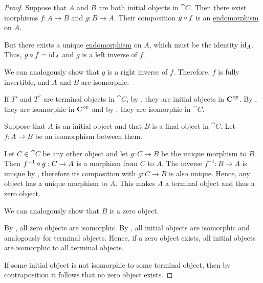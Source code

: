 \begin{proof}
   Suppose that \( A \) and \( B \) are both initial objects in \( \cat{C} \). Then there exist morphisms \( f: A \to B \) and \( g: B \to A \). Their composition \( g \bincirc f \) is an \hyperref[def:morphism_invertibility/endomorphism]{endomorphism} on \( A \).

  But there exists a unique \hyperref[def:morphism_invertibility/endomorphism]{endomorphism} on \( A \), which must be the identity \( \operatorname{id}_A \). Thus, \( g \bincirc f = \id_A \) and \( g \) is a left inverse of \( f \).

  We can analogously show that \( g \) is a right inverse of \( f \). Therefore, \( f \) is fully invertible, and \( A \) and \( B \) are isomorphic.

   If \( T' \) and \( T^\dprime \) are terminal objects in \( \cat{C} \), by , they are initial objects in \( \operatorname{\mathbf{C}}^{op} \). By , they are isomorphic in \( \operatorname{\mathbf{C}}^{op} \) and by , they are isomorphic in \( \cat{C} \).

   Suppose that \( A \) is an initial object and that \( B \) is a final object in \( \cat{C} \). Let \( f: A \to B \) be an isomorphism between them.

  Let \( C \in \cat{C} \) be any other object and let \( g: C \to B \) be the unique morphism to \( B \). Then \( f^{-1} \bincirc g: C \to A \) is a morphism from \( C \) to \( A \). The inverse \( f^{-1}: B \to A \) is unique by , therefore its composition with \( g: C \to B \) is also unique. Hence, any object has a unique morphism to \( A \). This makes \( A \) a terminal object and thus a zero object.

  We can analogously show that \( B \) is a zero object.

   By , all zero objects are isomorphic. By , all initial objects are isomorphic and analogously for terminal objects. Hence, if a zero object exists, all initial objects are isomorphic to all terminal objects.

  If some initial object is not isomorphic to some terminal object, then by contraposition it follows that no zero object exists.
\end{proof}
